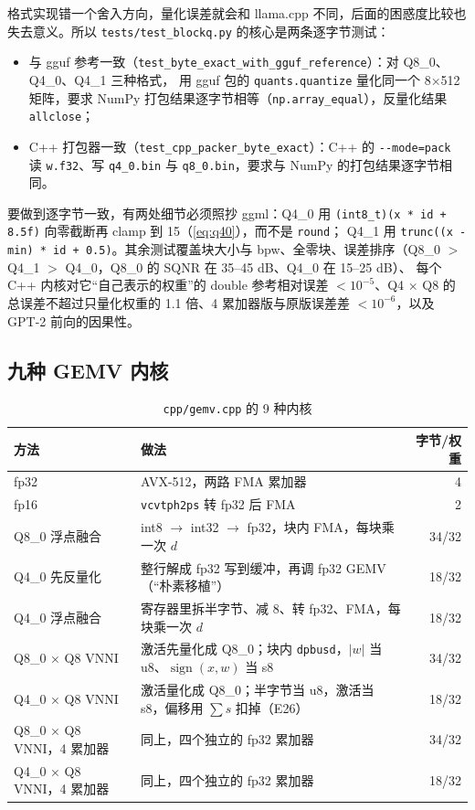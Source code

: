 \documentclass[11pt,a4paper]{ctexart}
\begin{document}
格式实现错一个舍入方向，量化误差就会和 llama.cpp 不同，后面的困惑度比较也失去意义。所以 \texttt{tests/test\_blockq.py} 的核心是两条逐字节测试：
\begin{itemize}
  \item 与 gguf 参考一致（\texttt{test\_byte\_exact\_with\_gguf\_reference}）：对 Q8\_0、Q4\_0、Q4\_1 三种格式，
        用 gguf 包的 \texttt{quants.quantize} 量化同一个 8×512 矩阵，要求 NumPy 打包结果逐字节相等（\texttt{np.array\_equal}），反量化结果 \texttt{allclose}；
  \item C++ 打包器一致（\texttt{test\_cpp\_packer\_byte\_exact}）：C++ 的 \texttt{-{}-mode=pack} 读 \texttt{w.f32}、写 \texttt{q4\_0.bin} 与 \texttt{q8\_0.bin}，要求与 NumPy 的打包结果逐字节相同。
\end{itemize}
要做到逐字节一致，有两处细节必须照抄 ggml：Q4\_0 用 \texttt{(int8\_t)(x * id + 8.5f)} 向零截断再 clamp 到 15（\cref{eq:q40}），而不是 \texttt{round}；
Q4\_1 用 \texttt{trunc((x - min) * id + 0.5)}。其余测试覆盖块大小与 bpw、全零块、误差排序（Q8\_0 $>$ Q4\_1 $>$ Q4\_0，Q8\_0 的 SQNR 在 35--45 dB、Q4\_0 在 15--25 dB）、
每个 C++ 内核对它“自己表示的权重”的 double 参考相对误差 $< 10^{-5}$、Q4 × Q8 的总误差不超过只量化权重的 1.1 倍、4 累加器版与原版误差差 $< 10^{-6}$，以及 GPT-2 前向的因果性。

\subsection{九种 GEMV 内核}\label{sec:kernels}

\begin{table}[H]
\centering\small
\caption{\texttt{cpp/gemv.cpp} 的 9 种内核}\label{tab:kernels}
\begin{tabularx}{\linewidth}{>{\raggedright\arraybackslash}p{3.6cm} >{\raggedright\arraybackslash}X r}
\toprule
方法 & 做法 & 字节/权重 \\
\midrule
fp32 & AVX-512，两路 FMA 累加器 & 4 \\
fp16 & \texttt{vcvtph2ps} 转 fp32 后 FMA & 2 \\
Q8\_0 浮点融合 & int8 $\to$ int32 $\to$ fp32，块内 FMA，每块乘一次 $d$ & 34/32 \\
Q4\_0 先反量化 & 整行解成 fp32 写到缓冲，再调 fp32 GEMV（“朴素移植”） & 18/32 \\
Q4\_0 浮点融合 & 寄存器里拆半字节、减 8、转 fp32、FMA，每块乘一次 $d$ & 18/32 \\
Q8\_0 × Q8 VNNI & 激活先量化成 Q8\_0；块内 \texttt{dpbusd}，$|w|$ 当 u8、$\operatorname{sign}(x, w)$ 当 s8 & 34/32 \\
Q4\_0 × Q8 VNNI & 激活量化成 Q8\_0；半字节当 u8，激活当 s8，偏移用 $\sum s$ 扣掉（E26） & 18/32 \\
Q8\_0 × Q8 VNNI，4 累加器 & 同上，四个独立的 fp32 累加器 & 34/32 \\
Q4\_0 × Q8 VNNI，4 累加器 & 同上，四个独立的 fp32 累加器 & 18/32 \\
\bottomrule
\end{tabularx}
\end{table}
\end{document}
